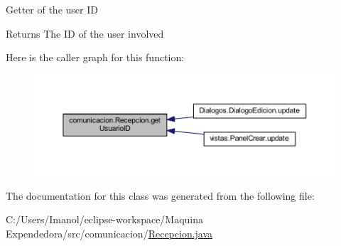 Getter of the user ID \begin{DoxyReturn}{Returns}
The ID of the user involved 
\end{DoxyReturn}
Here is the caller graph for this function\+:
\nopagebreak
\begin{figure}[H]
\begin{center}
\leavevmode
\includegraphics[width=350pt]{classcomunicacion_1_1_recepcion_a8beb628d06ac82fdde1ee50157c93bc4_icgraph}
\end{center}
\end{figure}


The documentation for this class was generated from the following file\+:\begin{DoxyCompactItemize}
\item 
C\+:/\+Users/\+Imanol/eclipse-\/workspace/\+Maquina Expendedora/src/comunicacion/\mbox{\hyperlink{_recepcion_8java}{Recepcion.\+java}}\end{DoxyCompactItemize}
